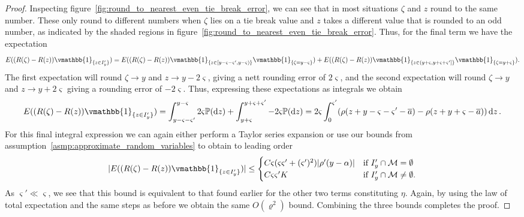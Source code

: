 \documentclass[manuscript,review]{acmart}
\newcommand{\indicatorfn}{\vmathbb{1}}
\begin{document}
\begin{proof}
Inspecting figure~\ref{fig:round_to_nearest_even_tie_break_error}, we can see that in most situations $ \zeta  $ and $ z $ round to the same number. These only round to different numbers when $ \zeta $ lies on a tie break value and $ z $ takes a different value that is rounded to an odd number, as indicated by the shaded regions in figure~\ref{fig:round_to_nearest_even_tie_break_error}. Thus, for the final term we have the expectation
\begin{equation*}
E((R(\zeta) - R(z))\indicatorfn_{\{z \in I'_y\}}) = 
E((R(\zeta) - R(z))\indicatorfn_{ \{z \in [y - \varsigma - \varsigma', y - \varsigma)\} } \indicatorfn_{\{\zeta = y - \varsigma\}})  +  E((R(\zeta) - R(z)) \indicatorfn_{ \{z \in (y + \varsigma, y + \varsigma + \varsigma']\} } \indicatorfn_{\{\zeta = y + \varsigma\}}).
\end{equation*}
The first expectation will round $ \zeta \to y $ and $ z \to y - 2\varsigma $, giving a nett rounding error of $ 2\varsigma $, and the second expectation will round $ \zeta \to y $ and $ z \to y + 2\varsigma $ giving a rounding error of $ -2\varsigma $. Thus, expressing these expectations as integrals we obtain
\begin{equation*}
E((R(\zeta) - R(z))\indicatorfn_{\{z \in I'_y\}})  = \int_{y - \varsigma - \varsigma'}^{y - \varsigma} 2\varsigma \mathbb{P}(\dd{z}) + \int_{y + \varsigma}^{y + \varsigma + \varsigma'} -2\varsigma \mathbb{P}(\dd{z}) = 2\varsigma \int_0^{\varsigma'} (\rho(z + y - \varsigma - \varsigma' - \overline{a}) - \rho(z + y + \varsigma - \overline{a})) \dd{z}.
\end{equation*}
For this final integral expression we can again either perform a Taylor series expansion or use our bounds from assumption~\ref{asmp:approximate_random_variables} to obtain to leading order
\begin{equation*}
\lvert E((R(\zeta) - R(z))\indicatorfn_{\{z \in I'_y\}}) \rvert \leq 
\begin{cases}
C \varsigma (\varsigma \varsigma' + (\varsigma')^2 ) \lvert \rho'(y-\alpha) \rvert  & \text{if } I'_y \cap \mathcal{M} = \emptyset \\
C\varsigma\varsigma' K & \text{if } I'_y \cap \mathcal{M} \neq \emptyset.
\end{cases}
\end{equation*}
As $ \varsigma' \ll \varsigma $, we see that this bound is equivalent to that found earlier for the other two terms constituting $ \eta $. Again, by using the law of total expectation and the same steps as before we obtain the same $ O(\varrho^2) $ bound. Combining the three bounds completes the proof. \qedhere
\end{proof}
\end{document}
